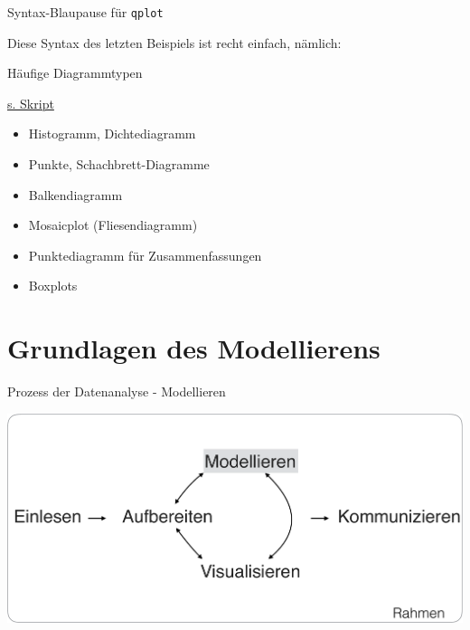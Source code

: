 \begin{frame}[fragile]{Syntax-Blaupause für \texttt{qplot}}

Diese Syntax des letzten Beispiels ist recht einfach, nämlich:

\begin{Shaded}
\begin{Highlighting}[]
\NormalTok{(} \NormalTok{)}
\end{Highlighting}
\end{Shaded}

\end{frame}

\begin{frame}{Häufige Diagrammtypen}

\href{https://sebastiansauer.github.io/Praxis_der_Datenanalyse/daten-visualisieren.html\#haufige-arten-von-diagrammen}{s.
Skript}

\begin{itemize}
\tightlist
\item
  Histogramm, Dichtediagramm
\item
  Punkte, Schachbrett-Diagramme
\item
  Balkendiagramm
\item
  Mosaicplot (Fliesendiagramm)
\item
  Punktediagramm für Zusammenfassungen
\item
  Boxplots
\end{itemize}

\end{frame}

\section{Grundlagen des Modellierens}\label{mod}

\begin{frame}{Prozess der Datenanalyse - Modellieren}

\begin{center}\includegraphics[width=0.7\linewidth]{../images/modellieren/Modellieren} \end{center}

\end{frame}

